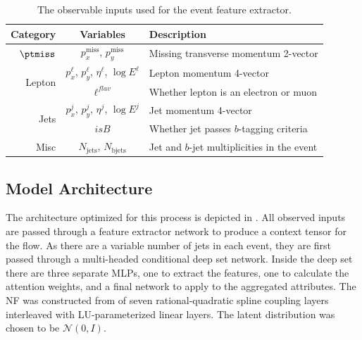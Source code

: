 \begin{table}[ht]
    \caption{The observable inputs used for the event feature extractor.}
    \label{tab:inputs}
    \centering
    \begin{tabular}{r c l}
        \toprule
        Category                & Variables                                              & Description                                 \\
        \midrule
        $\ptmiss$               & $p_x^\text{miss}$, $p_y^\text{miss}$                   & Missing transverse momentum 2-vector        \\ [2ex]
        \multirow{2}{*}{Lepton} & $p_x^{\ell}$, $p_y^{\ell}$, $\eta^\ell$, $\log E^\ell$ & Lepton momentum 4-vector                    \\
                                & $\ell^{flav}$                                          & Whether lepton is an electron or muon       \\ [2ex]
        \multirow{2}{*}{Jets}   & $p_x^{j}$, $p_y^j$, $\eta^j$,  $\log E^j$              & Jet momentum 4-vector                       \\
                                & $isB$                                                  & Whether jet passes $b$-tagging criteria     \\ [2ex]
        Misc                    & $N_{\text{jets}}$, $N_{\text{bjets}}$                  & Jet and $b$-jet multiplicities in the event \\
        \bottomrule
    \end{tabular}
\end{table}

\subsection{Model Architecture}

The \vflows architecture optimized for this process is depicted in .
All observed inputs are passed through a feature extractor network to produce a context tensor for the flow.
As there are a variable number of jets in each event, they are first passed through a multi-headed conditional deep set network.
Inside the deep set there are three separate MLPs, one to extract the features, one to calculate the attention weights, and a final network to apply to the aggregated attributes.
The NF was constructed from of seven rational-quadratic spline coupling layers~\cite{NeuralSplineFlows} interleaved with LU-parameterized linear layers.
The latent distribution was chosen to be $\mathcal{N}(0, I)$.

